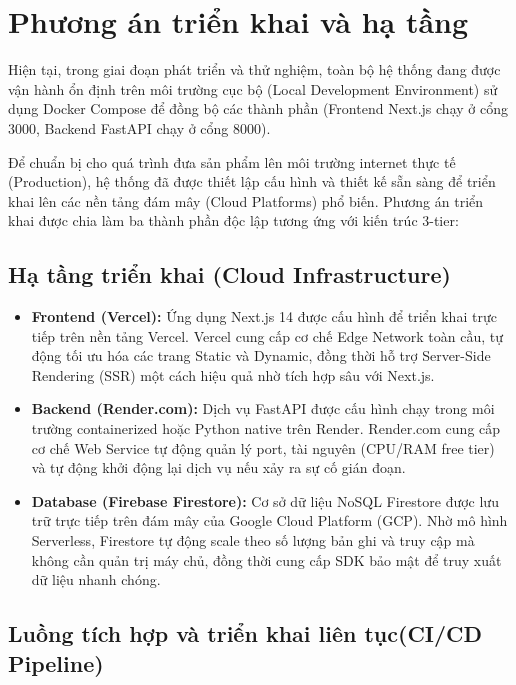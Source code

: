 \documentclass[12pt,a4paper]{report}
\begin{document}
\section{Phương án triển khai và hạ tầng}

Hiện tại, trong giai đoạn phát triển và thử nghiệm, toàn bộ hệ thống đang được vận hành ổn định trên môi trường cục bộ (Local Development Environment) sử dụng Docker Compose để đồng bộ các thành phần (Frontend Next.js chạy ở cổng 3000, Backend FastAPI chạy ở cổng 8000). 

Để chuẩn bị cho quá trình đưa sản phẩm lên môi trường internet thực tế (Production), hệ thống đã được thiết lập cấu hình và thiết kế sẵn sàng để triển khai lên các nền tảng đám mây (Cloud Platforms) phổ biến. Phương án triển khai được chia làm ba thành phần độc lập tương ứng với kiến trúc 3-tier:

\subsection{Hạ tầng triển khai (Cloud Infrastructure)}

\begin{itemize}[leftmargin=*]
    \item \textbf{Frontend (Vercel):} Ứng dụng Next.js 14 được cấu hình để triển khai trực tiếp trên nền tảng Vercel. Vercel cung cấp cơ chế Edge Network toàn cầu, tự động tối ưu hóa các trang Static và Dynamic, đồng thời hỗ trợ Server-Side Rendering (SSR) một cách hiệu quả nhờ tích hợp sâu với Next.js.
    \item \textbf{Backend (Render.com):} Dịch vụ FastAPI được cấu hình chạy trong môi trường containerized hoặc Python native trên Render. Render.com cung cấp cơ chế Web Service tự động quản lý port, tài nguyên (CPU/RAM free tier) và tự động khởi động lại dịch vụ nếu xảy ra sự cố gián đoạn.
    \item \textbf{Database (Firebase Firestore):} Cơ sở dữ liệu NoSQL Firestore được lưu trữ trực tiếp trên đám mây của Google Cloud Platform (GCP). Nhờ mô hình Serverless, Firestore tự động scale theo số lượng bản ghi và truy cập mà không cần quản trị máy chủ, đồng thời cung cấp SDK bảo mật để truy xuất dữ liệu nhanh chóng.
\end{itemize}

\subsection{Luồng tích hợp và triển khai liên tục(CI/CD Pipeline)}
\end{document}
